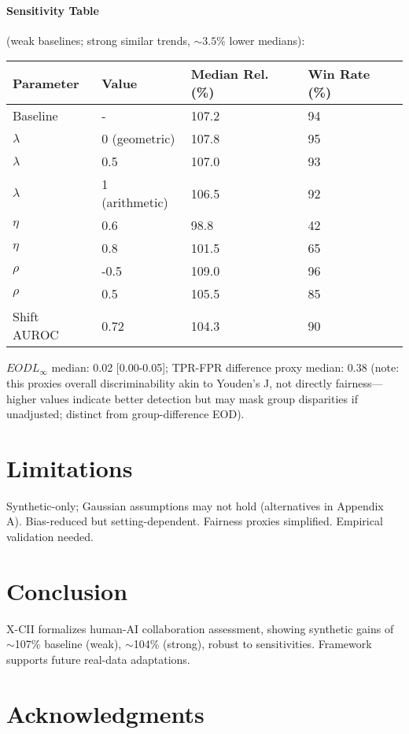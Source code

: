 \documentclass[a4paper]{article}
\begin{document}
\paragraph{Sensitivity Table} (weak baselines; strong similar trends, $\sim3.5\%$ lower medians):
\begin{longtable}{@{}llll@{}}
\toprule
Parameter & Value & Median Rel. (\%) & Win Rate (\%) \\
\midrule
\endhead
\bottomrule
\endlastfoot
Baseline & - & 107.2 & 94 \\
$\lambda$ & 0 (geometric) & 107.8 & 95 \\
$\lambda$ & 0.5 & 107.0 & 93 \\
$\lambda$ & 1 (arithmetic) & 106.5 & 92 \\
$\eta$ & 0.6 & 98.8 & 42 \\
$\eta$ & 0.8 & 101.5 & 65 \\
$\rho$ & -0.5 & 109.0 & 96 \\
$\rho$ & 0.5 & 105.5 & 85 \\
Shift AUROC & 0.72 & 104.3 & 90 \\
\end{longtable}

$EOD L_\infty$ median: 0.02 [0.00-0.05]; TPR-FPR difference proxy median: 0.38 (note: this proxies overall discriminability akin to Youden's J, not directly fairness---higher values indicate better detection but may mask group disparities if unadjusted; distinct from group-difference EOD).

\section{Limitations}

Synthetic-only; Gaussian assumptions may not hold (alternatives in Appendix A). Bias-reduced but setting-dependent. Fairness proxies simplified. Empirical validation needed.

\section{Conclusion}

X-CII formalizes human-AI collaboration assessment, showing synthetic gains of $\sim$107\% baseline (weak), $\sim$104\% (strong), robust to sensitivities. Framework supports future real-data adaptations.

\section{Acknowledgments}
\end{document}
